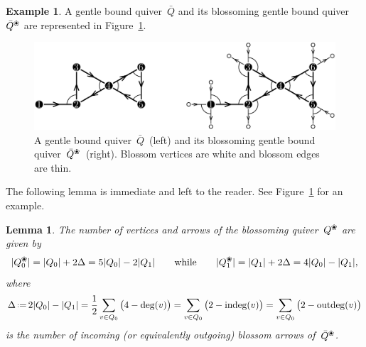 \documentclass{amsart}
\newtheorem{lemma}[theorem]{Lemma}
\theoremstyle{definition}
\newtheorem{example}[theorem]{Example}
\newcommand{\eqdef}{\mbox{\,\raisebox{0.2ex}{\scriptsize\ensuremath{\mathrm:}}\ensuremath{=}\,}} %
\newcommand{\fref}[1]{Figure~\ref{#1}} %
\newcommand{\blossom}{^\text{\ding{96}}} %
\newcommand{\indeg}{\mathrm{indeg}} %
\newcommand{\outdeg}{\mathrm{outdeg}} %
\begin{document}
\begin{example}
A gentle bound quiver~$\bar Q$ and its blossoming gentle bound quiver~$\bar Q\blossom$ are represented in \fref{fig:exmBlossomingQuiver}.
\vspace*{-.4cm}

\begin{figure}[h]
	\capstart
	\centerline{\includegraphics[scale=.7]{exmBlossomingQuiver}}
	\caption{A gentle bound quiver~$\bar Q$~(left) and its blossoming gentle bound quiver~$\bar Q\blossom$~(right). Blossom vertices are white and blossom edges are thin.}
	\label{fig:exmBlossomingQuiver}
\end{figure}
\end{example}

The following lemma is immediate and left to the reader.
See \fref{fig:exmBlossomingQuiver} for an example.

\begin{lemma}
The number of vertices and arrows of the blossoming quiver~$Q\blossom$ are given by
\[
|Q\blossom_0| = |Q_0| + 2\Delta = 5|Q_0|-2|Q_1|
\qquad\text{while}\qquad
|Q\blossom_1| = |Q_1| + 2\Delta = 4|Q_0|-|Q_1|,
\]
where
\[
\Delta \eqdef 2|Q_0| - |Q_1| = \frac{1}{2} \sum_{v \in Q_0} \big( 4-\deg(v) \big) = \sum_{v \in Q_0} \big( 2-\indeg(v) \big) = \sum_{v \in Q_0} \big( 2-\outdeg(v) \big)
\]
is the number of incoming (or equivalently outgoing) blossom arrows of~$\bar Q\blossom$.
\end{lemma}
\end{document}
